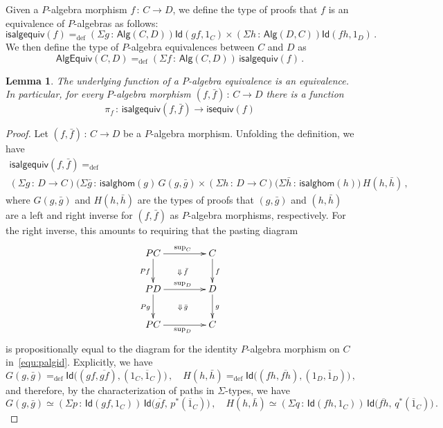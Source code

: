 \documentclass[10pt,a4paper,oneside,reqno]{amsart}
\numberwithin{equation}{section}
\theoremstyle{mythm}
\newtheorem{lemma}[theorem]{Lemma}
\theoremstyle{mydef}
\theoremstyle{myrmk}
\newcommand{\defeq}{=_{\mathrm{def}}}
\newcommand{\co}{\,{:}\,}
\newcommand{\Id}{\mathsf{Id}}
\newcommand{\Palg}{\mathsf{Alg}}
\renewcommand{\sup}{\mathrm{sup}}
\newcommand{\isalgequiv}{\mathsf{isalgequiv}}
\newcommand{\AlgEquiv}{\mathsf{AlgEquiv}}
\begin{document}
Given a $P$-algebra morphism $f \co C \to D$, we define the type of proofs that $f$ is an equivalence of $P$-algebras as follows:
\[
\isalgequiv(f) \defeq  (\Sigma g \co  \Palg(C,D)) \Id( g f, 1_C )  \times 
    (\Sigma h  \co \Palg(D, C)) \Id( f h , 1_D ) \, .
\]
We then define the type of $P$-algebra equivalences between $C$ and $D$ as
\[
\AlgEquiv(C, D)
\defeq   (\Sigma f \co \Palg(C,D)) \, \isalgequiv(f)  \, . 
\] 


\begin{lemma} The underlying function of a $P$-algebra equivalence is an equivalence. In particular, 
for every $P$-algebra morphism $(f, \bar{f}) \co C \to D$ there is a function 
\[
\pi_f \co \isalgequiv(f, \bar{f})  \to \mathsf{isequiv}(f)  
\]
\end{lemma}

\begin{proof} Let $(f, \bar{f}) \co C \to D$ be a $P$-algebra morphism. 
Unfolding the definition, we have
\begin{multline*}
\isalgequiv(f, \bar{f}) \defeq \\	 (\Sigma g \co D \to C) 
	 \big( \Sigma \bar{g} \co \mathsf{isalghom}(g) \, 
 		G(g, \bar{g})  \times
	 (\Sigma h \co D \to C) 
	 \big(\Sigma \bar{h} \co   \mathsf{isalghom}(h) )
	 \,  H(h, \bar{h}) \, , 
\end{multline*}
where 
$G(g, \bar{g})$ and $H(h, \bar{h})$ are the types of proofs that $(g, \bar{g})$ and $(h, \bar{h})$ are a left and right inverse for $(f, \bar{f})$ as 
$P$-algebra morphisms, respectively. For the right inverse, this amounts to requiring that the pasting diagram
\[
\xymatrix@C=1.5cm{
PC \ar[r]^{\sup_C} \ar[d]_{Pf}  \ar@{}[dr]|{\Downarrow \, \bar{f}} & C \ar[d]^f \\
PD \ar[r]^{\sup_D} \ar[d]_{Pg} \ar@{}[dr]|{\Downarrow \, \bar{g}} & D\ar[d]^g  \\
PC \ar[r]_{\sup_D} & C}
\]
is propositionally equal to the diagram for the identity $P$-algebra morphism on $C$ in~\eqref{equ:palgid}. 
Explicitly, we have
\[
G(g,\bar{g}) 
\defeq 
\Id \big( ( g  f,  \overline{gf}), (1_C, \overline{1}_C) \big)  \, , \quad 
H(h,\bar{h})     \defeq \Id \big( (   f h,  \overline{ f h}), (1_D, \overline{1}_D) \big)  \, ,
\]
and therefore, by the characterization of paths in $\Sigma$-types, we have
\[ 
G(g, \bar{g})  \simeq (\Sigma p \co \Id(g f ,  1_C) ) \, 
	\Id\big( \overline{gf}   ,\, p^*( \overline{1}_C)  \big) \, , \quad
H(h, \bar{h})  \simeq (\Sigma q \co \Id( f h ,  1_C) ) \, 
	\Id\big( \overline{fh}   ,\, q^*( \overline{1}_C)  \big) \,. 
\]
\end{proof}
\end{document}
